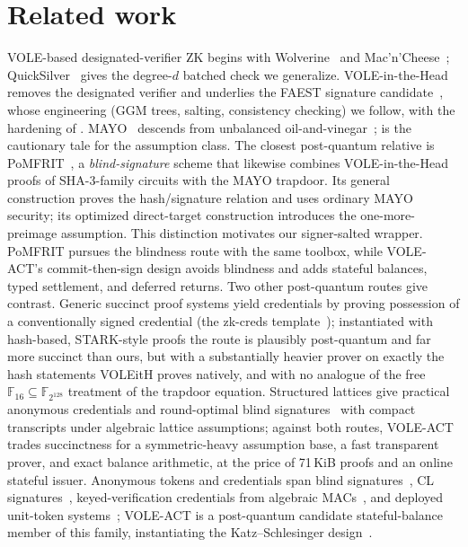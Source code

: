 \documentclass[11pt]{article}
\newcommand{\F}{\mathbb{F}}
\newcommand{\Fsixteen}{\F_{16}}
\newcommand{\Ftag}{\F_{2^{128}}}
\begin{document}
\section{Related work}

VOLE-based designated-verifier ZK begins with
Wolverine~\cite{Wolverine} and Mac'n'Cheese~\cite{MacNCheese};
QuickSilver~\cite{QuickSilver} gives the degree-$d$ batched check we
generalize. VOLE-in-the-Head~\cite{VOLEitH} removes the designated verifier
and underlies the FAEST signature candidate~\cite{FAEST}, whose engineering
(GGM trees, salting, consistency checking) we follow, with the hardening of
\cite{OneTree}. MAYO~\cite{Beullens21,MAYOspec} descends from unbalanced
oil-and-vinegar~\cite{UOV}; \cite{Beullens22} is the cautionary tale for the
assumption class. The closest post-quantum
relative is PoMFRIT~\cite{PoMFRIT}, a \emph{blind-signature} scheme that
likewise combines VOLE-in-the-Head proofs of SHA-3-family circuits with the
MAYO trapdoor. Its general construction proves the hash/signature relation
and uses ordinary MAYO security; its optimized direct-target construction
introduces the one-more-preimage assumption. This distinction motivates our
signer-salted wrapper. PoMFRIT pursues the blindness route with the same
toolbox, while VOLE-ACT's commit-then-sign design avoids
blindness and adds stateful balances, typed settlement, and deferred
returns. Two other post-quantum routes give contrast. Generic succinct
proof systems yield credentials by proving possession of a conventionally
signed credential (the zk-creds template~\cite{zkcreds}); instantiated
with hash-based, STARK-style proofs the route is plausibly post-quantum
and far more succinct than ours, but with a substantially heavier prover
on exactly the hash statements VOLEitH proves natively, and with no
analogue of the free $\Fsixteen \subseteq \Ftag$ treatment of the
trapdoor equation. Structured lattices give practical anonymous
credentials and round-optimal blind signatures~\cite{BLNS23,BLNSblind}
with compact transcripts under algebraic lattice assumptions; against
both routes, VOLE-ACT trades succinctness for a symmetric-heavy
assumption base, a fast transparent prover, and exact balance arithmetic,
at the price of 71\,KiB proofs and an online stateful issuer. Anonymous
tokens and credentials span
blind signatures~\cite{Chaum82}, CL signatures~\cite{CL01},
keyed-verification credentials from algebraic MACs~\cite{CMZ14}, and
deployed unit-token systems~\cite{PrivacyPass}; VOLE-ACT is a post-quantum
candidate stateful-balance member of this family, instantiating the
Katz--Schlesinger design~\cite{KS}.
\end{document}
